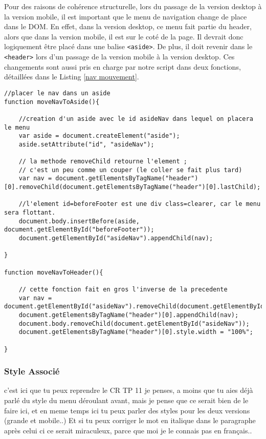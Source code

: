 \documentclass{scrartcl}
\newcommand{\code}[1]{\texttt{#1}}
\begin{document}
Pour des raisons de cohérence structurelle, lors du passage de la version desktop à la version mobile, il est important que le menu de navigation change de place dans le DOM. En effet, dans la version desktop, ce menu fait partie du header, alors que dans la version mobile, il est sur le coté de la page. Il devrait donc logiquement être placé dans une balise \code{<aside>}. De plus, il doit revenir dans le \code{<header>} lors d'un passage de la version mobile à la version desktop. Ces changements sont aussi pris en charge par notre script dans deux fonctions, détaillées dans le Listing \ref{nav mouvement}.


\begin{lstlisting}[label={nav movement}, caption={Fonctions Assurant le Mouvement du Menu de Navigation}]
//placer le nav dans un aside
function moveNavToAside(){
    
    //creation d'un aside avec le id asideNav dans lequel on placera le menu
    var aside = document.createElement("aside");
    aside.setAttribute("id", "asideNav");
    
    // la methode removeChild retourne l'element ;
    // c'est un peu comme un couper (le coller se fait plus tard)
    var nav = document.getElementsByTagName("header")[0].removeChild(document.getElementsByTagName("header")[0].lastChild);
    
    //l'element id=beforeFooter est une div class=clearer, car le menu sera flottant.
    document.body.insertBefore(aside, document.getElementById("beforeFooter"));
    document.getElementById("asideNav").appendChild(nav);
   
}

function moveNavToHeader(){
    
    // cette fonction fait en gros l'inverse de la precedente
    var nav = document.getElementById("asideNav").removeChild(document.getElementById("asideNav").lastChild);
    document.getElementsByTagName("header")[0].appendChild(nav);
    document.body.removeChild(document.getElementById("asideNav"));
    document.getElementsByTagName("header")[0].style.width = "100%";

}

\end{lstlisting}


\subsubsection{Style Associé}

c'est ici que tu peux reprendre le CR TP 11 je penses, a moins que tu aies déjà parlé du style du menu déroulant avant, mais je pense que ce serait bien de le faire ici, et en meme temps ici tu peux parler des styles pour les deux versions (grande et mobile..) Et si tu peux corriger le mot en italique dans le paragraphe après celui ci ce serait miraculeux, parce que moi je le connais pas en français..
\end{document}
